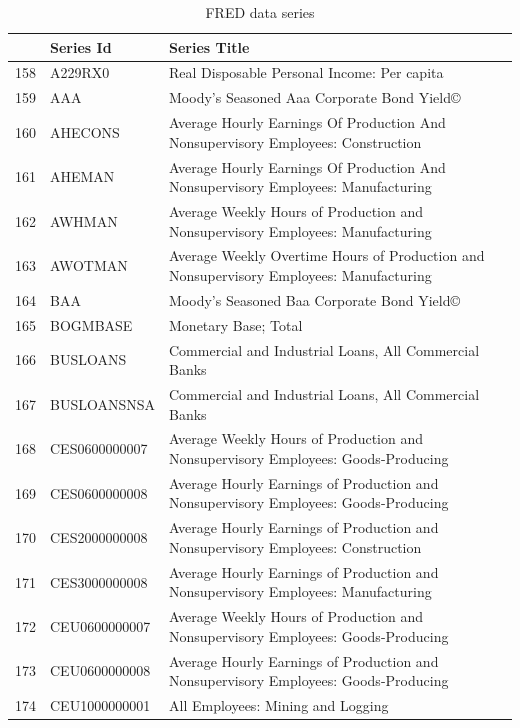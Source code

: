 \documentclass[11pt]{article}
\begin{document}
\begin{table}
\centering
\label{FRED data series}
\caption{FRED data series}
\begin{tabular}{rp{5cm}p{11cm}}
	& \textbf{Series Id} & \textbf{Series Title} \\
  \hline
  \hline
	158 & A229RX0 & Real Disposable Personal Income: Per capita \\
  \hline
	159 & AAA & Moody's Seasoned Aaa Corporate Bond Yield© \\
  \hline
	160 & AHECONS & Average Hourly Earnings Of Production And Nonsupervisory Employees: Construction \\
  \hline
	161 & AHEMAN & Average Hourly Earnings Of Production And Nonsupervisory Employees: Manufacturing \\
  \hline
	162 & AWHMAN & Average Weekly Hours of Production and Nonsupervisory Employees: Manufacturing \\ 
  \hline
	163 & AWOTMAN & Average Weekly Overtime Hours of Production and Nonsupervisory Employees: Manufacturing \\
  \hline
	164 & BAA & Moody's Seasoned Baa Corporate Bond Yield© \\
  \hline
	165 & BOGMBASE & Monetary Base; Total \\
  \hline
	166 & BUSLOANS & Commercial and Industrial Loans, All Commercial Banks \\
  \hline
	167 & BUSLOANSNSA & Commercial and Industrial Loans, All Commercial Banks \\
  \hline
	168 & CES0600000007 & Average Weekly Hours of Production and Nonsupervisory Employees: Goods-Producing \\
  \hline
	169 & CES0600000008 & Average Hourly Earnings of Production and Nonsupervisory Employees: Goods-Producing \\
  \hline
	170 & CES2000000008 & Average Hourly Earnings of Production and Nonsupervisory Employees: Construction \\
  \hline
	171 & CES3000000008 & Average Hourly Earnings of Production and Nonsupervisory Employees: Manufacturing \\
  \hline
	172 & CEU0600000007 & Average Weekly Hours of Production and Nonsupervisory Employees: Goods-Producing \\
  \hline
	173 & CEU0600000008 & Average Hourly Earnings of Production and Nonsupervisory Employees: Goods-Producing \\
  \hline
	174 & CEU1000000001 & All Employees: Mining and Logging \\

\end{tabular}
\end{table}
\end{document}

